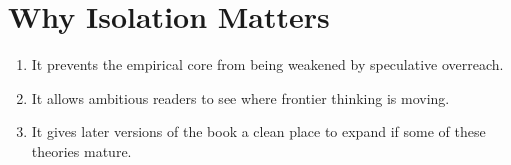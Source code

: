 \section{Why Isolation Matters}

\begin{enumerate}[nosep]
  \item It prevents the empirical core from being weakened by speculative
        overreach.
  \item It allows ambitious readers to see where frontier thinking is moving.
  \item It gives later versions of the book a clean place to expand if some of
        these theories mature.
\end{enumerate}
